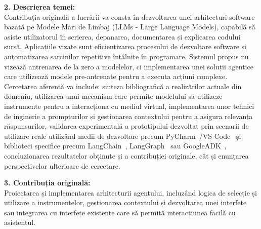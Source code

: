 \documentclass[12pt, a4paper, oneside, romanian]{teza-upb}
\begin{document}
{  \noindent \textbf{2. Descrierea temei:}\\
  Contribuția originală a lucrării va consta în dezvoltarea unei arhitecturi software bazată pe Modele Mari de Limbaj (LLMs - Large Language Models), capabilă să asiste utilizatorul în scrierea, depanarea, documentarea și explicarea codului sursă. Aplicațiile vizate sunt eficientizarea procesului de dezvoltare software și automatizarea sarcinilor repetitive întâlnite în programare. Sistemul propus nu vizează antrenarea de la zero a modelelor, ci implementarea unei soluții agentice care utilizează modele pre-antrenate pentru a executa acțiuni complexe. Cercetarea aferentă va include: sinteza bibliografică a realizărilor actuale din domeniu, utilizarea unui mecanism care permite modelului să utilizeze instrumente pentru a interacționa cu mediul virtual, implementarea unor tehnici de inginerie a prompturilor și gestionarea contextului pentru a asigura relevanța răspunsurilor, validarea experimentală a prototipului dezvoltat prin scenarii de utilizare reale utilizând medii de dezvoltare precum PyCharm~\cite{web_pycharm}/VS Code~\cite{web_vscode} și biblioteci specifice precum LangChain~\cite{web_langchain}, LangGraph~\cite{web_langgraph} sau GoogleADK~\cite{api_google_adk}, concluzionarea rezultatelor obținute și a contribuției originale, cât și enunțarea perspectivelor ulterioare de cercetare.

  \vspace{0.2cm}

  \noindent \textbf{3. Contribuția originală:}\\
  Proiectarea și implementarea arhitecturii agentului, incluzând logica de selecție și utilizare a instrumentelor, gestionarea contextului și dezvoltarea unei interfețe sau integrarea cu interfețe existente care să permită interacțiunea facilă cu asistentul.

  \vspace{0.2cm}

}
\end{document}
